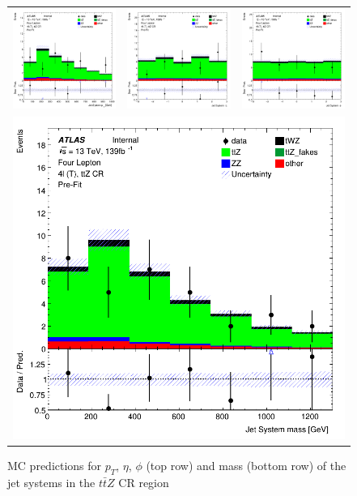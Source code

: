 \clearpage
\begin{figure}[htbp]
\centering
  \begin{tabular}{ccc}

    \includegraphics[width=.2\textwidth]{figures/PreFitPlots/lep4_ttZ_4T_Jet_sys_Pt}&
    \includegraphics[width=.2\textwidth]{figures/PreFitPlots/lep4_ttZ_4T_Jet_sys_Eta} &
    \includegraphics[width=.2\textwidth]{figures/PreFitPlots/lep4_ttZ_4T_Jet_sys_Phi} \\
    \multicolumn{3}{c}{\includegraphics[width=.2\textwidth]{figures/PreFitPlots/lep4_ttZ_4T_Jet_sys_mass}}

  \end{tabular}
  \caption{MC predictions for $p_{T}$, $\eta$, $\phi$ (top row) and mass (bottom row) of the jet systems in the $t\bar{t}Z$ CR region }
  \label{fig:4lep-ttZ-CR-jet-sys-Plots}
\end{figure}


